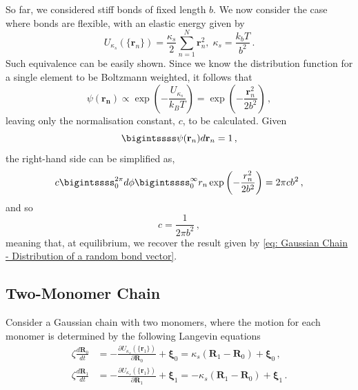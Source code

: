 \documentclass[../../main.tex]{subfiles}
\begin{document}
    So far, we considered stiff bonds of fixed length $b$. We now consider the case where bonds are flexible, with an elastic energy given by
        \begin{equation}\label{eq: Gaussian Chain - Harmonic Spring Potential}
            U_{\kappa_s}(\{\mathbf{r}_n\}) = \frac{\kappa_s}{2}\sum_{n=1}^N \mathbf{r}_n^2, \; \kappa_s = \frac{k_bT}{b^2} \,.
        \end{equation}
    Such equivalence can be easily shown. Since we know the distribution function for a single element to be Boltzmann weighted, it follows that
        \begin{equation}
            \psi(\mathbf{\mathbf{r}_n}) \propto \exp \left(-\frac{U_{\kappa_s}}{k_BT}\right) = \exp \left(-\frac{\mathbf{r}_n^2}{2b^2}\right) \,,
        \end{equation}
    leaving only the normalisation constant, $c$, to be calculated. Given 
        \begin{equation}\label{eq: Gaussian Chain - Normalization Integral}
            \bigintssss \psi(\mathbf{r}_n) d\mathbf{r}_n = 1 \,,
        \end{equation}
    the right-hand side can be simplified as,
        \begin{equation}
            c \bigintssss_0^{2\pi} d\phi \bigintssss_0^\infty r_n\exp\left(-\frac{r_n^2}{2b^2}\right) = 2\pi c b^2 \,,
        \end{equation}
    and so
        \begin{equation}
            c = \frac{1}{2\pi b^2} \,,
        \end{equation}
    meaning that, at equilibrium, we recover the result given by \cref{eq: Gaussian Chain - Distribution of a random bond vector}.
    
\subsection{Two-Monomer Chain}\label{subSection: The 2 Monomer Chain}
    Consider a Gaussian chain with two monomers, where the motion for each monomer is determined by the following Langevin equations
        \begin{align}
            \label{eq: Case for 2 Monomers - langevin for the monomer [1]}
            \zeta \frac{d\mathbf{R}_0}{dt} &= -\frac{\partial  U_{\kappa_s}(\{\mathbf{r}_1\})}{\partial \mathbf{R}_0} + \bm{\xi}_0 = \kappa_s \left( \mathbf{R}_1 - \mathbf{R}_0 \right) + \bm{\xi}_0 \,,\\
            \label{eq: Case for 2 Monomers - langevin for the monomer [2]}
            \zeta \frac{d\mathbf{R}_1}{dt} &= -\frac{\partial  U_{\kappa_s}(\{\mathbf{r}_1\})}{\partial \mathbf{R}_1} + \bm{\xi}_1 = -\kappa_s \left( \mathbf{R}_1 - \mathbf{R}_0 \right) + \bm{\xi}_1 \,. 
        \end{align}
    
\end{document}
